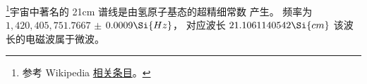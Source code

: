 
\begin{issues}
\issueDraft
\issueMissDepend
\end{issues}

\footnote{参考 Wikipedia \href{https://en.wikipedia.org/wiki/Hydrogen_line}{相关条目}。}宇宙中著名的 21cm 谱线是由氢原子基态的超精细常数%
产生。 频率为 $1,420,405,751.7667$ $\pm$ $0.0009 \Si{Hz}$， 对应波长 $21.1061140542\Si{cm}$ 该波长的电磁波属于微波。
